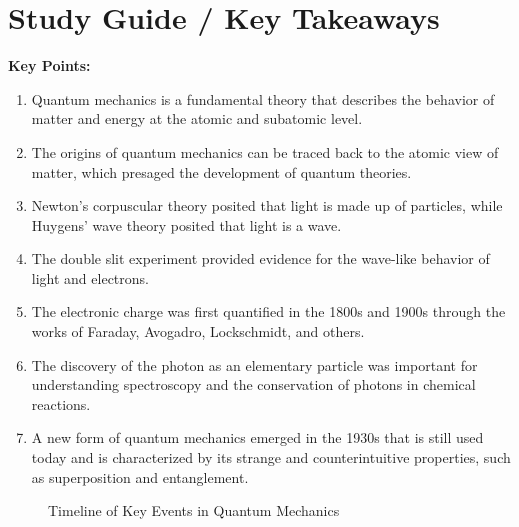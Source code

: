\documentclass{article}
\begin{document}
\section*{Study Guide / Key Takeaways}

\begin{tcolorbox}[colback=blue!5!white, colframe=blue!75!black]
    \textbf{Key Points:}
    \begin{enumerate}
        \item Quantum mechanics is a fundamental theory that describes the behavior of matter and energy at the atomic and subatomic level.
        \item The origins of quantum mechanics can be traced back to the atomic view of matter, which presaged the development of quantum theories.
        \item Newton's corpuscular theory posited that light is made up of particles, while Huygens' wave theory posited that light is a wave.
        \item The double slit experiment provided evidence for the wave-like behavior of light and electrons.
        \item The electronic charge was first quantified in the 1800s and 1900s through the works of Faraday, Avogadro, Lockschmidt, and others.
        \item The discovery of the photon as an elementary particle was important for understanding spectroscopy and the conservation of photons in chemical reactions.
        \item A new form of quantum mechanics emerged in the 1930s that is still used today and is characterized by its strange and counterintuitive properties, such as superposition and entanglement.
    \end{enumerate}
\end{tcolorbox}

\begin{figure}[h]
    \centering
    \caption{Timeline of Key Events in Quantum Mechanics}
\end{figure}
\end{document}
